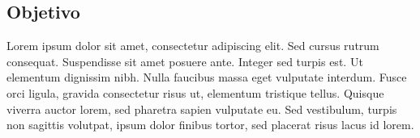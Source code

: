 \subsection{Objetivo}
Lorem ipsum dolor sit amet, consectetur adipiscing elit. Sed cursus rutrum consequat. Suspendisse sit amet posuere ante. Integer sed turpis est. Ut elementum dignissim nibh. Nulla faucibus massa eget vulputate interdum. Fusce orci ligula, gravida consectetur risus ut, elementum tristique tellus. Quisque viverra auctor lorem, sed pharetra sapien vulputate eu. Sed vestibulum, turpis non sagittis volutpat, ipsum dolor finibus tortor, sed placerat risus lacus id lorem. \cite{c_freitas_uma_2014}